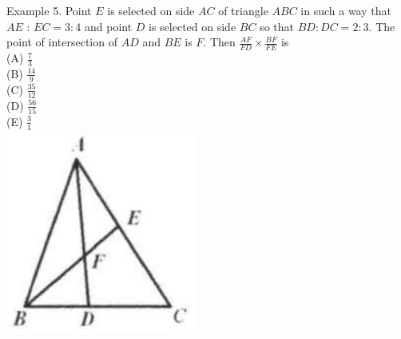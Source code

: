 \documentclass[10pt]{article}
\begin{document}
Example 5. Point \(E\) is selected on side \(A C\) of triangle \(A B C\) in such a way that \(A E\) : \(E C=3: 4\) and point \(D\) is selected on side \(B C\) so that \(B D: D C=2: 3\). The point of intersection of \(A D\) and \(B E\) is \(F\). Then \(\frac{A F}{F D} \times \frac{B F}{F E}\) is\\
(A) \(\frac{7}{3}\)\\
(B) \(\frac{14}{9}\)\\
(C) \(\frac{35}{12}\)\\
(D) \(\frac{56}{15}\)\\
(E) \(\frac{3}{1}\)\\
\includegraphics[max width=\textwidth, center]{2025_04_17_97bc1f7e44d93c271a88g-106}
\end{document}

